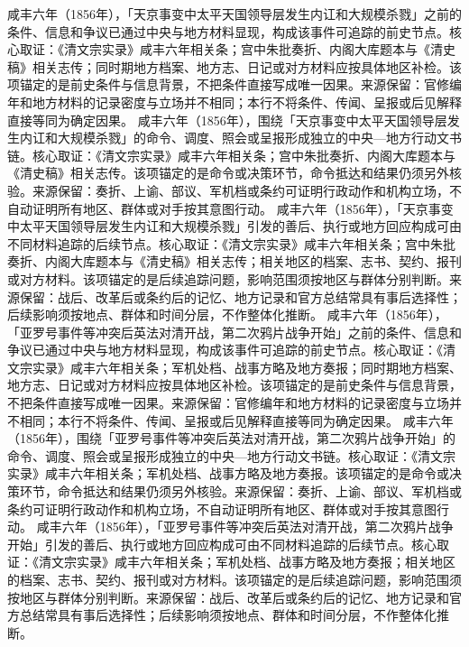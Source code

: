咸丰六年（1856年），「天京事变中太平天国领导层发生内讧和大规模杀戮」之前的条件、信息和争议已通过中央与地方材料显现，构成该事件可追踪的前史节点。核心取证：《清文宗实录》咸丰六年相关条；宫中朱批奏折、内阁大库题本与《清史稿》相关志传；同时期地方档案、地方志、日记或对方材料应按具体地区补检。该项锚定的是前史条件与信息背景，不把条件直接写成唯一因果。来源保留：官修编年和地方材料的记录密度与立场并不相同；本行不将条件、传闻、呈报或后见解释直接等同为确定因果。
咸丰六年（1856年），围绕「天京事变中太平天国领导层发生内讧和大规模杀戮」的命令、调度、照会或呈报形成独立的中央—地方行动文书链。核心取证：《清文宗实录》咸丰六年相关条；宫中朱批奏折、内阁大库题本与《清史稿》相关志传。该项锚定的是命令或决策环节，命令抵达和结果仍须另外核验。来源保留：奏折、上谕、部议、军机档或条约可证明行政动作和机构立场，不自动证明所有地区、群体或对手按其意图行动。
咸丰六年（1856年），「天京事变中太平天国领导层发生内讧和大规模杀戮」引发的善后、执行或地方回应构成可由不同材料追踪的后续节点。核心取证：《清文宗实录》咸丰六年相关条；宫中朱批奏折、内阁大库题本与《清史稿》相关志传；相关地区的档案、志书、契约、报刊或对方材料。该项锚定的是后续追踪问题，影响范围须按地区与群体分别判断。来源保留：战后、改革后或条约后的记忆、地方记录和官方总结常具有事后选择性；后续影响须按地点、群体和时间分层，不作整体化推断。
咸丰六年（1856年），「亚罗号事件等冲突后英法对清开战，第二次鸦片战争开始」之前的条件、信息和争议已通过中央与地方材料显现，构成该事件可追踪的前史节点。核心取证：《清文宗实录》咸丰六年相关条；军机处档、战事方略及地方奏报；同时期地方档案、地方志、日记或对方材料应按具体地区补检。该项锚定的是前史条件与信息背景，不把条件直接写成唯一因果。来源保留：官修编年和地方材料的记录密度与立场并不相同；本行不将条件、传闻、呈报或后见解释直接等同为确定因果。
咸丰六年（1856年），围绕「亚罗号事件等冲突后英法对清开战，第二次鸦片战争开始」的命令、调度、照会或呈报形成独立的中央—地方行动文书链。核心取证：《清文宗实录》咸丰六年相关条；军机处档、战事方略及地方奏报。该项锚定的是命令或决策环节，命令抵达和结果仍须另外核验。来源保留：奏折、上谕、部议、军机档或条约可证明行政动作和机构立场，不自动证明所有地区、群体或对手按其意图行动。
咸丰六年（1856年），「亚罗号事件等冲突后英法对清开战，第二次鸦片战争开始」引发的善后、执行或地方回应构成可由不同材料追踪的后续节点。核心取证：《清文宗实录》咸丰六年相关条；军机处档、战事方略及地方奏报；相关地区的档案、志书、契约、报刊或对方材料。该项锚定的是后续追踪问题，影响范围须按地区与群体分别判断。来源保留：战后、改革后或条约后的记忆、地方记录和官方总结常具有事后选择性；后续影响须按地点、群体和时间分层，不作整体化推断。
